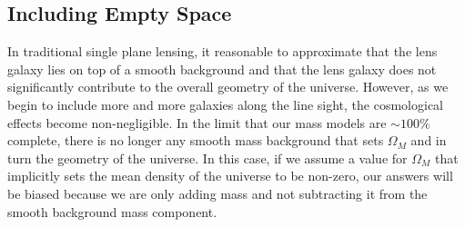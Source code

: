 \subsection{Including Empty Space} \label{sec:Voids}
In traditional single plane lensing, it reasonable to approximate that the lens galaxy lies on top of a smooth background and that the lens galaxy does not significantly contribute to the overall geometry of the universe. However, as we begin to include more and more galaxies along the line sight, the cosmological effects become non-negligible. In the limit that our mass models are $\sim100\%$ complete, there is no longer any smooth mass background that sets $\Omega_M$ and in turn the geometry of the universe. In this case, if we assume a value for $\Omega_M$ that implicitly sets the mean density of the universe to be non-zero, our answers will be biased because we are only adding mass and not subtracting it from the smooth background mass component. 
